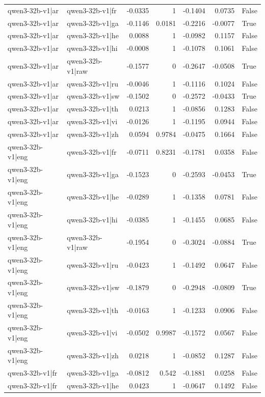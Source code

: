 \begin{table}
\begin{tabular}{l l r r r r l}
qwen3-32b-v1|ar & qwen3-32b-v1|fr & -0.0335 & 1 & -0.1404 & 0.0735 & False \\
qwen3-32b-v1|ar & qwen3-32b-v1|ga & -0.1146 & 0.0181 & -0.2216 & -0.0077 & True \\
qwen3-32b-v1|ar & qwen3-32b-v1|he & 0.0088 & 1 & -0.0982 & 0.1157 & False \\
qwen3-32b-v1|ar & qwen3-32b-v1|hi & -0.0008 & 1 & -0.1078 & 0.1061 & False \\
qwen3-32b-v1|ar & qwen3-32b-v1|raw & -0.1577 & 0 & -0.2647 & -0.0508 & True \\
qwen3-32b-v1|ar & qwen3-32b-v1|ru & -0.0046 & 1 & -0.1116 & 0.1024 & False \\
qwen3-32b-v1|ar & qwen3-32b-v1|sw & -0.1502 & 0 & -0.2572 & -0.0433 & True \\
qwen3-32b-v1|ar & qwen3-32b-v1|th & 0.0213 & 1 & -0.0856 & 0.1283 & False \\
qwen3-32b-v1|ar & qwen3-32b-v1|vi & -0.0126 & 1 & -0.1195 & 0.0944 & False \\
qwen3-32b-v1|ar & qwen3-32b-v1|zh & 0.0594 & 0.9784 & -0.0475 & 0.1664 & False \\
qwen3-32b-v1|eng & qwen3-32b-v1|fr & -0.0711 & 0.8231 & -0.1781 & 0.0358 & False \\
qwen3-32b-v1|eng & qwen3-32b-v1|ga & -0.1523 & 0 & -0.2593 & -0.0453 & True \\
qwen3-32b-v1|eng & qwen3-32b-v1|he & -0.0289 & 1 & -0.1358 & 0.0781 & False \\
qwen3-32b-v1|eng & qwen3-32b-v1|hi & -0.0385 & 1 & -0.1455 & 0.0685 & False \\
qwen3-32b-v1|eng & qwen3-32b-v1|raw & -0.1954 & 0 & -0.3024 & -0.0884 & True \\
qwen3-32b-v1|eng & qwen3-32b-v1|ru & -0.0423 & 1 & -0.1492 & 0.0647 & False \\
qwen3-32b-v1|eng & qwen3-32b-v1|sw & -0.1879 & 0 & -0.2948 & -0.0809 & True \\
qwen3-32b-v1|eng & qwen3-32b-v1|th & -0.0163 & 1 & -0.1233 & 0.0906 & False \\
qwen3-32b-v1|eng & qwen3-32b-v1|vi & -0.0502 & 0.9987 & -0.1572 & 0.0567 & False \\
qwen3-32b-v1|eng & qwen3-32b-v1|zh & 0.0218 & 1 & -0.0852 & 0.1287 & False \\
qwen3-32b-v1|fr & qwen3-32b-v1|ga & -0.0812 & 0.542 & -0.1881 & 0.0258 & False \\
qwen3-32b-v1|fr & qwen3-32b-v1|he & 0.0423 & 1 & -0.0647 & 0.1492 & False \\

\end{tabular}
\end{table}
